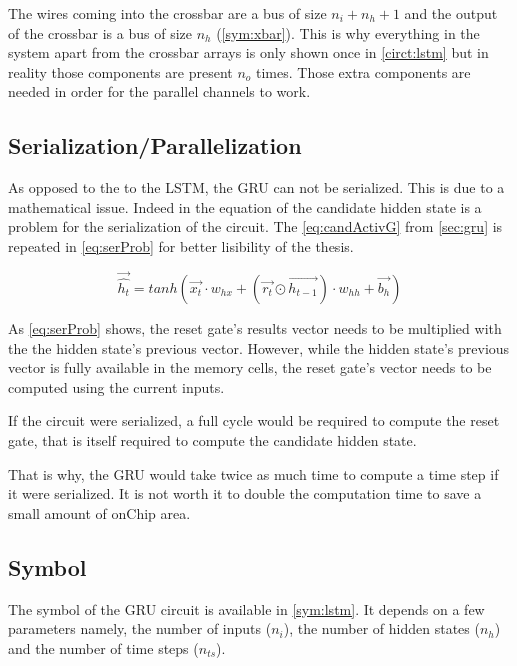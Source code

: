 The wires coming into the crossbar are a bus of size $n_i+n_h+1$ and the output of the crossbar is a bus of size $n_h$ (\cref{sym:xbar}). This is why everything in the system apart from the crossbar arrays is only shown once in \cref{circt:lstm} but in reality those components are present $n_o$ times. Those extra components are needed in order for the parallel channels to work.

\subsection{Serialization/Parallelization}
\label{subsec:gruSerPar}

As opposed to the to the \ac{LSTM}, the \ac{GRU} can not be serialized. This is due to a mathematical issue. Indeed in the equation of the candidate hidden state is a problem for the serialization of the circuit. The \cref{eq:candActivG} from \cref{sec:gru} is repeated in \cref{eq:serProb} for better lisibility of the thesis.

\begin{equation}\label{eq:serProb}
  \overrightarrow{\hat{h_t}}=tanh(\overrightarrow{x_t}\cdot w_{hx}+(\overrightarrow{r_t}\odot\overrightarrow{h_{t-1}}) \cdot w_{hh} + \overrightarrow{b_h})
\end{equation}

As \cref{eq:serProb} shows, the reset gate's results vector needs to be multiplied with the the hidden state's previous vector. However, while the hidden state's previous vector is fully available in the memory cells, the reset gate's vector needs to be computed using the current inputs.

If the circuit were serialized, a full cycle would be required to compute the reset gate, that is itself required to compute the candidate hidden state.

That is why, the \ac{GRU} would take twice as much time to compute a time step if it were serialized. It is not worth it to double the computation time to save a small amount of onChip area.

\subsection{Symbol}

The symbol of the \ac{GRU} circuit is available in \cref{sym:lstm}. It depends on a few parameters namely, the number of inputs ($n_i$), the number of hidden states ($n_h$) and the number of time steps ($n_{ts}$).


